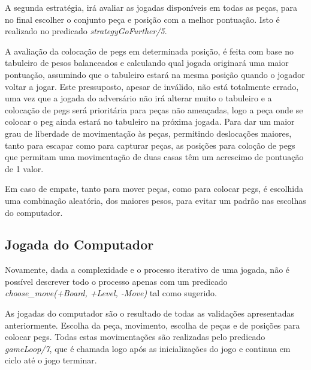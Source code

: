 \documentclass[paper=a4, fontsize=11pt]{scrartcl} %
\numberwithin{equation}{section} %
\numberwithin{figure}{section} %
\numberwithin{table}{section} %
\begin{document}
A segunda estratégia, irá avaliar as jogadas disponíveis em todas as peças, para no final escolher o conjunto peça e posição com a melhor pontuação. Isto é realizado no predicado \textit{strategyGoFurther/5}.

A avaliação da colocação de pegs em determinada posição, é feita com base no tabuleiro de pesos balanceados e calculando qual jogada originará uma maior pontuação, assumindo que o tabuleiro estará na mesma posição quando o jogador voltar a jogar. Este pressuposto, apesar de inválido, não está totalmente errado, uma vez que a jogada do adversário não irá alterar muito o tabuleiro e a colocação de pegs será prioritária para peças não ameaçadas, logo a peça onde se colocar o peg ainda estará no tabuleiro na próxima jogada. Para dar um maior grau de liberdade de movimentação às peças, permitindo deslocações maiores, tanto para escapar como para capturar peças, as posições para coloção de pegs que permitam uma movimentação de duas casas têm um acrescimo de pontuação de 1 valor.

Em caso de empate, tanto para mover peças, como para colocar pegs, é escolhida uma combinação aleatória, dos maiores pesos,  para evitar um padrão nas escolhas do computador.

\subsection{Jogada do Computador} \label{jogcomp}

Novamente, dada a complexidade e o processo iterativo de uma jogada, não é possível descrever todo o processo apenas com um predicado \textit{choose\_move(+Board, +Level, -Move)} tal como sugerido.

As jogadas do computador são o resultado de todas as validações apresentadas anteriormente. Escolha da peça, movimento, escolha de peças e de posições para colocar pegs. Todas estas movimentações são realizadas pelo predicado \textit{gameLoop/7}, que é chamada logo após as inicializações do jogo e continua em ciclo até o jogo terminar.
\end{document}
